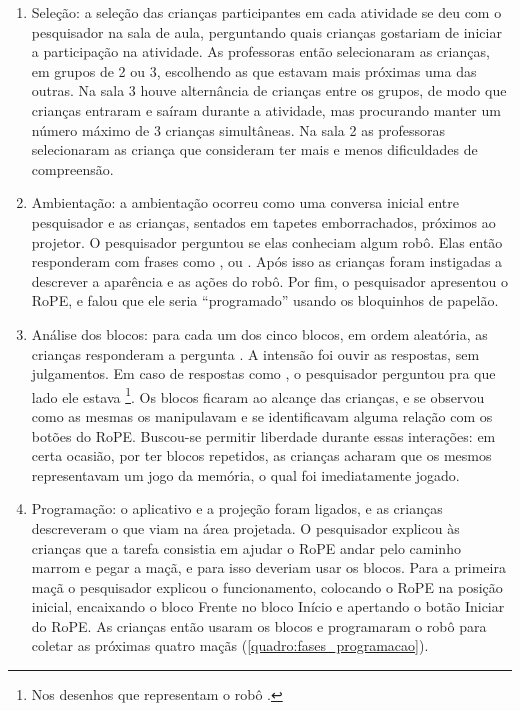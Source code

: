 \begin{enumerate}
    \item Seleção: a seleção das crianças participantes em cada atividade se deu com o pesquisador na sala de aula, perguntando quais crianças gostariam de iniciar a participação na atividade. As professoras então selecionaram as crianças, em grupos de 2 ou 3, escolhendo as que estavam mais próximas uma das outras. Na sala 3 houve alternância de crianças entre os grupos, de modo que crianças entraram e saíram durante a atividade, mas procurando manter um número máximo de 3 crianças simultâneas. Na sala 2 as professoras selecionaram as criança que consideram ter mais e menos dificuldades de compreensão.
    
    \item Ambientação: a ambientação ocorreu como uma conversa inicial entre pesquisador e as crianças, sentados em tapetes emborrachados, próximos ao projetor. O pesquisador perguntou se elas conheciam algum robô. Elas então responderam com frases como , ou . Após isso as crianças foram instigadas a descrever a aparência e as ações do robô. Por fim, o pesquisador apresentou o RoPE, e falou que ele seria “programado” usando os bloquinhos de papelão.
    
    \item Análise dos blocos: para cada um dos cinco blocos, em ordem aleatória, as crianças responderam a pergunta . A intensão foi ouvir as respostas, sem julgamentos. Em caso de respostas como , o pesquisador perguntou pra que lado ele estava \footnote{Nos desenhos que representam o robô .}. Os blocos ficaram ao alcançe das crianças, e se observou como as mesmas os manipulavam e se identificavam alguma relação com os botões do RoPE. Buscou-se permitir liberdade durante essas interações: em certa ocasião, por ter blocos repetidos, as crianças acharam que os mesmos representavam um jogo da memória, o qual foi imediatamente jogado.
    
    \item Programação: o aplicativo e a projeção foram ligados, e as crianças descreveram o que viam na área projetada. O pesquisador explicou às crianças que a tarefa consistia em ajudar o RoPE andar pelo caminho marrom e pegar a maçã, e para isso deveriam usar os blocos. Para a primeira maçã o pesquisador explicou o funcionamento, colocando o RoPE na posição inicial, encaixando o bloco Frente no bloco Início e apertando o botão Iniciar do RoPE. As crianças então usaram os blocos e programaram o robô para coletar as próximas quatro maçãs (\autoref{quadro:fases_programacao}). 
    

\end{enumerate}
